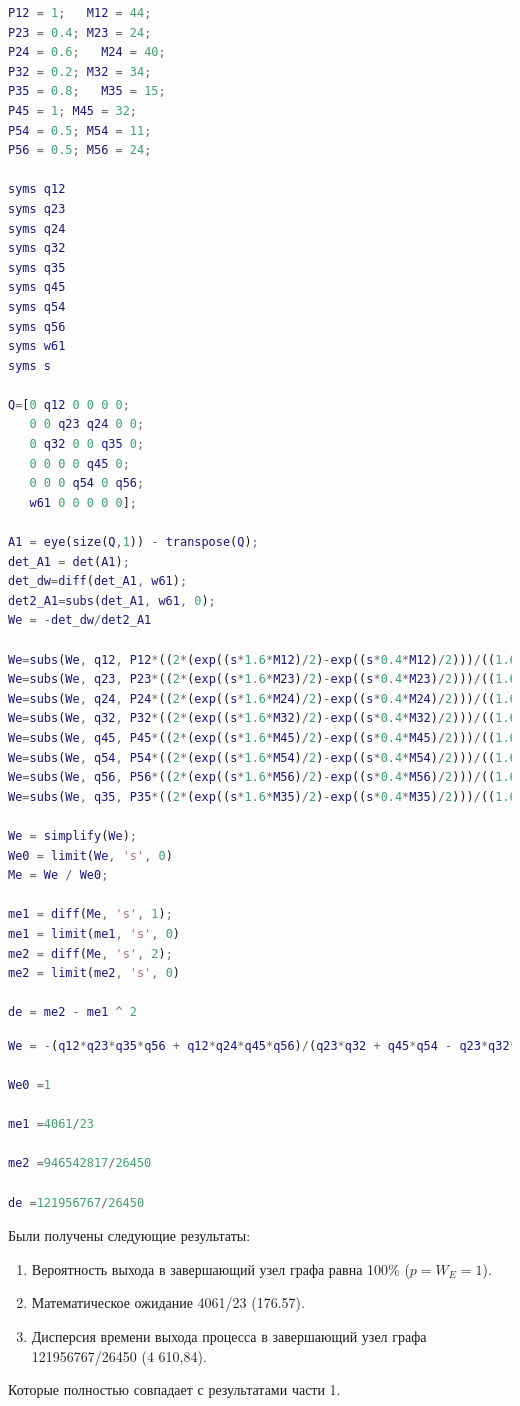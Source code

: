 \documentclass[14pt,a4paper,report]{report}
\begin{document}
\begin{lstlisting}[language={matlab}, caption={Matlab скрипт}, basicstyle=\ttfamily]
P12 = 1;   M12 = 44; 
P23 = 0.4; M23 = 24; 
P24 = 0.6;   M24 = 40; 
P32 = 0.2; M32 = 34; 
P35 = 0.8;   M35 = 15; 
P45 = 1; M45 = 32; 
P54 = 0.5; M54 = 11; 
P56 = 0.5; M56 = 24;

syms q12
syms q23
syms q24
syms q32
syms q35
syms q45
syms q54
syms q56
syms w61
syms s

Q=[0 q12 0 0 0 0;
   0 0 q23 q24 0 0;
   0 q32 0 0 q35 0;
   0 0 0 0 q45 0;
   0 0 0 q54 0 q56;
   w61 0 0 0 0 0];

A1 = eye(size(Q,1)) - transpose(Q);
det_A1 = det(A1);
det_dw=diff(det_A1, w61);
det2_A1=subs(det_A1, w61, 0);
We = -det_dw/det2_A1

We=subs(We, q12, P12*((2*(exp((s*1.6*M12)/2)-exp((s*0.4*M12)/2)))/((1.6*M12-0.4*M12)*s))^2);
We=subs(We, q23, P23*((2*(exp((s*1.6*M23)/2)-exp((s*0.4*M23)/2)))/((1.6*M23-0.4*M23)*s))^2);
We=subs(We, q24, P24*((2*(exp((s*1.6*M24)/2)-exp((s*0.4*M24)/2)))/((1.6*M24-0.4*M24)*s))^2);
We=subs(We, q32, P32*((2*(exp((s*1.6*M32)/2)-exp((s*0.4*M32)/2)))/((1.6*M32-0.4*M32)*s))^2);
We=subs(We, q45, P45*((2*(exp((s*1.6*M45)/2)-exp((s*0.4*M45)/2)))/((1.6*M45-0.4*M45)*s))^2);
We=subs(We, q54, P54*((2*(exp((s*1.6*M54)/2)-exp((s*0.4*M54)/2)))/((1.6*M54-0.4*M54)*s))^2);
We=subs(We, q56, P56*((2*(exp((s*1.6*M56)/2)-exp((s*0.4*M56)/2)))/((1.6*M56-0.4*M56)*s))^2);
We=subs(We, q35, P35*((2*(exp((s*1.6*M35)/2)-exp((s*0.4*M35)/2)))/((1.6*M35-0.4*M35)*s))^2);

We = simplify(We);
We0 = limit(We, 's', 0)
Me = We / We0;

me1 = diff(Me, 's', 1);
me1 = limit(me1, 's', 0)
me2 = diff(Me, 's', 2);
me2 = limit(me2, 's', 0)

de = me2 - me1 ^ 2
\end{lstlisting}

\begin{lstlisting}[language={matlab}, caption={Результат}, basicstyle=\ttfamily]
We = -(q12*q23*q35*q56 + q12*q24*q45*q56)/(q23*q32 + q45*q54 - q23*q32*q45*q54 - 1)
 
We0 =1
 
me1 =4061/23
 
me2 =946542817/26450
 
de =121956767/26450
\end{lstlisting}

Были получены следующие результаты:
\begin{enumerate}
\item Вероятность выхода в завершающий узел графа равна 100\% ($p=W_E=1$).
\item Математическое ожидание 4061/23 (176.57).
\item Дисперсия времени выхода процесса в завершающий узел графа 121956767/26450 (4 610,84).
\end{enumerate}
Которые полностью совпадает с результатами части 1.
\end{document}
